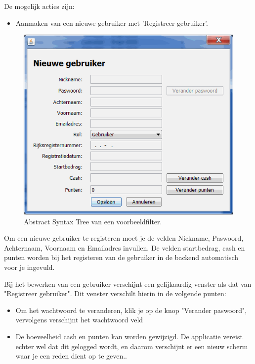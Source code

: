 De mogelijk acties zijn:
\begin{itemize}
\item{Aanmaken van een nieuwe gebruiker met 'Registreer gebruiker'.}
\end{itemize}

\begin{figure}[h!]
	\centering
		\includegraphics[width=\textwidth]{images/handleiding/handleiding4.gif}
	\caption{Abstract Syntax Tree van een voorbeeldfilter.}
\end{figure}

Om een nieuwe gebruiker te registeren moet je de velden Nickname, Paswoord, Achternaam, Voornaam en Emailadres invullen. 
De velden startbedrag, cash en punten worden bij het registeren van de gebruiker in de backend automatisch voor je ingevuld.

Bij het bewerken van een gebruiker verschijnt een gelijkaardig venster als dat van "Registreer gebruiker".
Dit venster verschilt hierin in de volgende punten:

\begin{itemize}
\item{Om het wachtwoord te veranderen, klik je op de knop "Verander paswoord", vervolgens verschijnt het wachtwoord veld}
\item{De hoeveelheid cash en punten kan worden gewijzigd. De applicatie vereist echter wel dat dit gelogged wordt, en daarom verschijnt er een nieuw scherm waar je een reden dient op te geven..}
\end{itemize}

